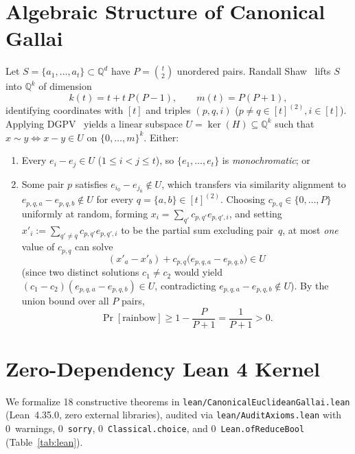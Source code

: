 \documentclass[11pt,twocolumn]{article}
\newcommand{\QQ}{\mathbb{Q}}
\begin{document}
\section{Algebraic Structure of Canonical Gallai}\label{sec:prelim}
Let $S = \{a_1,\dots,a_t\} \subset \QQ^d$ have $P = \binom{t}{2}$ unordered pairs. Randall Shaw~\cite{randallshaw2026gallai} lifts $S$ into $\QQ^k$ of dimension
\begin{equation}
  k(t) = t + t\,P(P - 1), \qquad m(t) = P(P + 1),
  \label{eq:lift}
\end{equation}
identifying coordinates with $[t]$ and triples $(p, q, i)$ ($p \neq q \in [t]^{(2)}, i \in [t]$). Applying DGPV~\cite{deuber1983canonical} yields a linear subspace $U = \ker(H) \subseteq \QQ^k$ such that $x \sim y \iff x - y \in U$ on $\{0,\dots,m\}^k$. Either:
\begin{enumerate}[leftmargin=*,nosep]
  \item Every $e_i - e_j \in U$ ($1 \le i < j \le t$), so $\{e_1,\dots,e_t\}$ is \emph{monochromatic}; or
  \item Some pair $p$ satisfies $e_{i_0} - e_{j_0} \notin U$, which transfers via similarity alignment to $e_{p,q,a} - e_{p,q,b} \notin U$ for every $q = \{a,b\} \in [t]^{(2)}$. Choosing $c_{p,q} \in \{0,\dots,P\}$ uniformly at random, forming $x_i = \sum_{q'} c_{p,q'} e_{p,q',i}$, and setting $x'_i := \sum_{q' \neq q} c_{p,q'} e_{p,q',i}$ to be the partial sum excluding pair~$q$, at most \emph{one} value of $c_{p,q}$ can solve
  \begin{equation}
    (x'_a - x'_b) + c_{p,q}\bigl(e_{p,q,a} - e_{p,q,b}\bigr) \in U
    \label{eq:unique-bad}
  \end{equation}
  (since two distinct solutions $c_1 \neq c_2$ would yield $(c_1 - c_2)(e_{p,q,a} - e_{p,q,b}) \in U$, contradicting $e_{p,q,a} - e_{p,q,b} \notin U$). By the union bound over all $P$ pairs,
  \begin{equation}
    \Pr[\text{rainbow}] \ge 1 - \frac{P}{P + 1} = \frac{1}{P + 1} > 0.
    \label{eq:union-bound}
  \end{equation}
\end{enumerate}

\section{Zero-Dependency Lean 4 Kernel}\label{sec:lean}
We formalize 18 constructive theorems in \texttt{lean/CanonicalEuclideanGallai.lean} (Lean~4.35.0, zero external libraries), audited via \texttt{lean/AuditAxioms.lean} with 0~warnings, 0~\texttt{sorry}, 0~\texttt{Classical.choice}, and 0~\texttt{Lean.ofReduceBool} (Table~\ref{tab:lean}).
\end{document}
